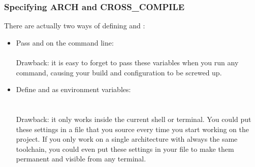 \begin{frame}
  \frametitle{Specifying ARCH and CROSS\_COMPILE}
  There are actually two ways of defining  and :
  \begin{itemize}
  \item Pass  and  on the 
    command line: \\
     \\
    Drawback: it is easy to forget to pass these variables when
    you run any  command, causing your build and
    configuration to be screwed up.
  \item Define  and  as environment
    variables: \\
     \\
     \\
    Drawback: it only works inside the current
    shell or terminal. You could put these settings in a file
    that you source every time you start working on the project.
    If you only work on a single architecture with always the
    same toolchain, you could even put these settings in your
     file to make them permanent and visible from
    any terminal.
  \end{itemize}
\end{frame}


